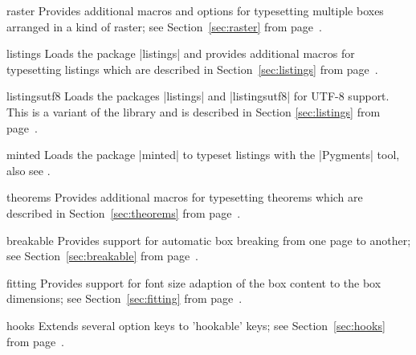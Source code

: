 {\begin{docTcbKey}[library]{raster}{}{}
  Provides additional macros and options for typesetting multiple
  boxes arranged in a kind of raster;
  see Section~\ref{sec:raster} from page~\pageref{sec:raster}.
\end{docTcbKey}

\begin{docTcbKey}[library]{listings}{}{}
  Loads the package |listings| \cite{heinz:2013a} and provides additional
  macros for typesetting listings which are described in Section~\ref{sec:listings}
  from page~\pageref{sec:listings}.
\end{docTcbKey}

\begin{docTcbKey}[library]{listingsutf8}{}{}
  Loads the packages |listings| \cite{heinz:2013a} and
  |listingsutf8| \cite{oberdiek:2011a} for UTF-8 support.
  This is a variant of the library 
  and is described in Section \ref{sec:listings}
  from page~\pageref{sec:listings}.
\end{docTcbKey}

\begin{docTcbKey}[library]{minted}{}{}
  Loads the package |minted| \cite{rudolph:2011a} to
  typeset listings with the |Pygments| \cite{pygments:2013} tool,
  also see .
\end{docTcbKey}

\begin{docTcbKey}[library]{theorems}{}{}
  Provides additional
  macros for typesetting theorems which are described in Section~\ref{sec:theorems}
  from page~\pageref{sec:theorems}.
\end{docTcbKey}


\begin{docTcbKey}[library]{breakable}{}{}
  Provides support for automatic box breaking from one page to another;
  see Section~\ref{sec:breakable} from page~\pageref{sec:breakable}.
\end{docTcbKey}

\begin{docTcbKey}[library]{fitting}{}{}
  Provides support for font size adaption of the box content to
  the box dimensions;
  see Section~\ref{sec:fitting} from page~\pageref{sec:fitting}.
\end{docTcbKey}

\begin{docTcbKey}[library]{hooks}{}{}
  Extends several option keys to 'hookable' keys;
  see Section~\ref{sec:hooks} from page~\pageref{sec:hooks}.
\end{docTcbKey}

}
